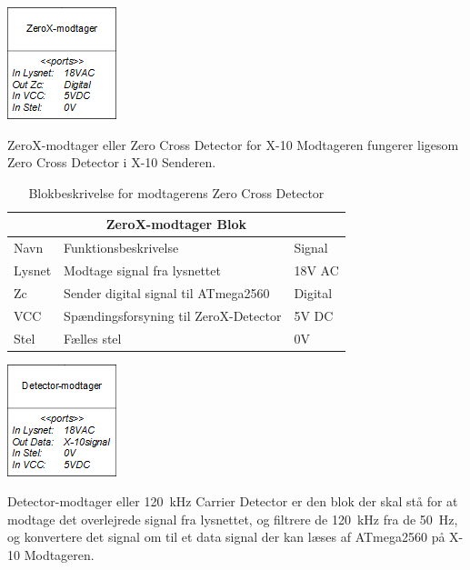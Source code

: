 \documentclass[11pt]{article}
\begin{document}
\begin{minipage}[Ht]{0.40\linewidth}
	\centering
	\includegraphics{ZeroX-modtager-blok.png}
\end{minipage}
\hfill
\begin{minipage}[!t]{0.60\linewidth}
	\centering
   		ZeroX-modtager eller Zero Cross Detector for X-10 Modtageren fungerer ligesom Zero Cross Detector i X-10 Senderen.
\end{minipage}%
\hfill

\begin{table}[H]
\centering
	\begin{tabular}{l|l|l}
	
	\toprule[0.4mm]\midrule \multicolumn{3}{c}{\textbf{ZeroX-modtager Blok}}\\
	\midrule[0.4mm] Navn & Funktionsbeskrivelse & Signal\\ \midrule[0.3mm]
	 Lysnet & Modtage signal fra lysnettet & 18V AC\\
	 Zc & Sender digital signal til ATmega2560 & Digital\\
	 VCC & Spændingsforsyning til ZeroX-Detector & 5V DC\\
	 Stel & Fælles stel  & 0V\\
	 \midrule\bottomrule[0.4mm]

	\end{tabular}
	\caption{Blokbeskrivelse for modtagerens Zero Cross Detector}
	\label{tab: Bloktabel ZeroX modtager}
\end{table}
\qquad

\begin{minipage}[Ht]{0.40\linewidth}
	\centering
	\includegraphics{Detector-modtager-blok.png}
\end{minipage}
\hfill
\begin{minipage}[!t]{0.60\linewidth}
	\centering
   		Detector-modtager eller \SI{120}{\kilo \Hz} Carrier Detector er den blok der skal stå for at modtage det overlejrede signal fra lysnettet, og filtrere de \SI{120}{\kilo \Hz} fra de \SI{50}{\Hz}, og konvertere det signal om til et data signal der kan læses af ATmega2560 på X-10 Modtageren.
\end{minipage}%
\hfill
\end{document}
